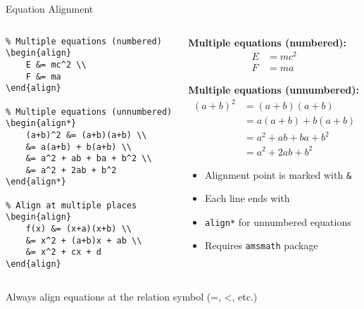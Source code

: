 \begin{frame}[fragile]{Equation Alignment}
    \begin{columns}
        \begin{column}{0.5\textwidth}
            \begin{lstlisting}
% Multiple equations (numbered)
\begin{align}
    E &= mc^2 \\
    F &= ma
\end{align}

% Multiple equations (unnumbered)
\begin{align*}
    (a+b)^2 &= (a+b)(a+b) \\
    &= a(a+b) + b(a+b) \\
    &= a^2 + ab + ba + b^2 \\
    &= a^2 + 2ab + b^2
\end{align*}

% Align at multiple places
\begin{align}
    f(x) &= (x+a)(x+b) \\
    &= x^2 + (a+b)x + ab \\
    &= x^2 + cx + d
\end{align}
            \end{lstlisting}
        \end{column}
        
        \begin{column}{0.5\textwidth}
            \textbf{Multiple equations (numbered):}
            \begin{align}
                E &= mc^2 \\
                F &= ma
            \end{align}
            
            \textbf{Multiple equations (unnumbered):}
            \begin{align*}
                (a+b)^2 &= (a+b)(a+b) \\
                &= a(a+b) + b(a+b) \\
                &= a^2 + ab + ba + b^2 \\
                &= a^2 + 2ab + b^2
            \end{align*}
            
            \begin{itemize}
                \item Alignment point is marked with \texttt{\&}
                \item Each line ends with \texttt{\\}
                \item \texttt{align*} for unnumbered equations
                \item Requires \texttt{amsmath} package
            \end{itemize}
        \end{column}
    \end{columns}
    
    \begin{tip}
        Always align equations at the relation symbol (=, <, etc.)
    \end{tip}
\end{frame}

